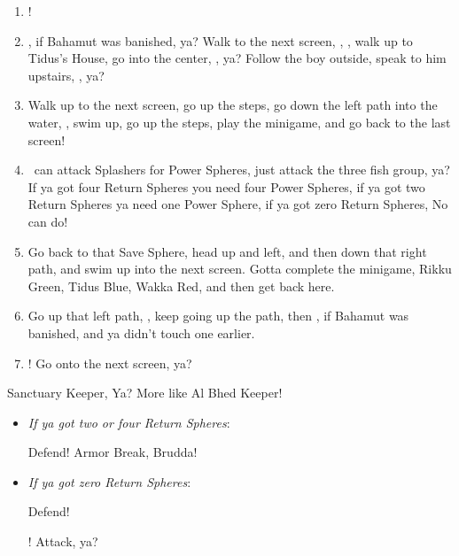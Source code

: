 \begin{enumerate}[resume]
\item \formation{\tidus}{\kimahri}{\auron}!
\item \save, if Bahamut was banished, ya? Walk to the next screen, \skippablefmv[0:20], \sd, walk up to Tidus's House, go into the center, \sd, ya? Follow the boy outside, speak to him upstairs, \sd, ya?
\item Walk up to the next screen, go up the steps, go down the left path into the water, \sd, swim up, go up the steps, play the minigame, and go back to the last screen!
\item \tidus\ can attack Splashers for Power Spheres, just attack the three fish group, ya? If ya got four Return Spheres you need four Power Spheres, if ya got two Return Spheres ya need one Power Sphere, if ya got zero Return Spheres, No can do!
\item Go back to that Save Sphere, head up and left, and then down that right path, and swim up into the next screen. Gotta complete the minigame, Rikku Green, Tidus Blue, Wakka Red, and then get back here.
\item Go up that left path, \sd, keep going up the path, then \save, if Bahamut was banished, and ya didn't touch one earlier.
\item \formation{\tidus}{\yuna}{\wakka}! Go onto the next screen, ya?
\end{enumerate}
\begin{battle}[40000]{Sanctuary Keeper, Ya? More like Al Bhed Keeper!}
\begin{itemize}
\item \textit{If ya got two or four Return Spheres}:
\begin{itemize}
\yunaf Defend!
\tidusf Armor Break, Brudda!
\end{itemize}
\item \textit{If ya got zero Return Spheres}:
\begin{itemize}
\tidusf Defend!
\end{itemize}
\summon{\bahamut}!
\bahamutf Attack, ya?
\end{itemize}
\end{battle}
\winnpsingle\lossnpsingle